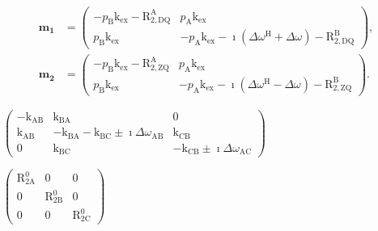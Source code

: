 \documentclass[a4paper,11pt,twoside,openright]{book}
\def\lthtmlcheckvsize{\ifdim\ht\sizebox<\vsize 
  \ifdim\wd\sizebox<\hsize\expandafter\hfill\fi \expandafter\vfill
  \else\expandafter\vss\fi}%
\begin{document}
{\newpage\clearpage
\setcounter{equation}{64}
%
\begin{subequations}\begin{align}
\mathbf{m_1} &= \begin{pmatrix}
-p_{\textrm{B}}\textrm{k}_{\textrm{ex}}- \mathrm{R}_{\mathrm{2,DQ}}^{\mathrm{A}}& p_{\textrm{A}}\textrm{k}_{\textrm{ex}}\\
p_{\textrm{B}}\textrm{k}_{\textrm{ex}}& - p_{\textrm{A}}\textrm{k}_{\textrm{ex}}-\imath(\Delta\omega^{\scriptscriptstyle\mathrm{H}}+ \Delta\omega ) - \mathrm{R}_{\mathrm{2,DQ}}^{\mathrm{B}}
\end{pmatrix}, \\
\mathbf{m_2} &=  \begin{pmatrix}
-p_{\textrm{B}}\textrm{k}_{\textrm{ex}}- \mathrm{R}_{\mathrm{2,ZQ}}^{\mathrm{A}}& p_{\textrm{A}}\textrm{k}_{\textrm{ex}}\\
p_{\textrm{B}}\textrm{k}_{\textrm{ex}}& - p_{\textrm{A}}\textrm{k}_{\textrm{ex}}-\imath(\Delta\omega^{\scriptscriptstyle\mathrm{H}}- \Delta\omega ) - \mathrm{R}_{\mathrm{2,ZQ}}^{\mathrm{B}}
\end{pmatrix}.
\end{align}\end{subequations}%
\lthtmldisplayZ
\lthtmlcheckvsize\clearpage}

{\newpage\clearpage
{}%
$\displaystyle \begin{pmatrix}
-\textrm{k}_{\textrm{AB}}& \textrm{k}_{\textrm{BA}}& 0    \\
\textrm{k}_{\textrm{AB}}& -\textrm{k}_{\textrm{BA}}-\textrm{k}_{\textrm{BC}}\pm\imath\Delta\omega_{\textrm{AB}}& \textrm{k}_{\textrm{CB}}\\
0     & \textrm{k}_{\textrm{BC}}& -\textrm{k}_{\textrm{CB}}\pm\imath\Delta\omega_{\textrm{AC}}
\end{pmatrix}$%
\lthtmlindisplaymathZ
\lthtmlcheckvsize\clearpage}

{\newpage\clearpage
{}%
$\displaystyle \begin{pmatrix}
\mathrm{R}_{\mathrm{2A}}^0& 0          & 0    \\
0          & \mathrm{R}_{\mathrm{2B}}^0& 0    \\
0          & 0          & \mathrm{R}_{\mathrm{2C}}^0
\end{pmatrix}$%
\lthtmlindisplaymathZ
\lthtmlcheckvsize\clearpage}
\end{document}
